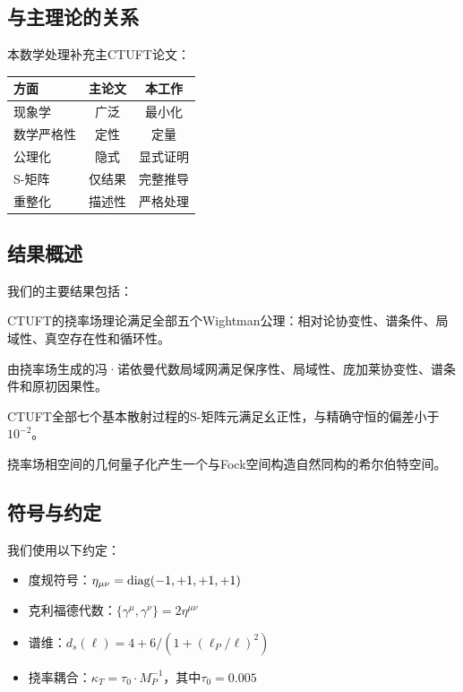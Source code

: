 \subsection{与主理论的关系}

本数学处理补充主CTUFT论文\cite{wang2026ctuft}：

\begin{center}
\begin{tabular}{|l|c|c|}
\hline
\textbf{方面} & \textbf{主论文} & \textbf{本工作} \\
\hline
现象学 & 广泛 & 最小化 \\
数学严格性 & 定性 & 定量 \\
公理化 & 隐式 & 显式证明 \\
S-矩阵 & 仅结果 & 完整推导 \\
重整化 & 描述性 & 严格处理 \\
\hline
\end{tabular}
\end{center}

\subsection{结果概述}

我们的主要结果包括：

\begin{theorem}[Wightman公理]
CTUFT的挠率场理论满足全部五个Wightman公理：相对论协变性、谱条件、局域性、真空存在性和循环性。
\end{theorem}

\begin{theorem}
由挠率场生成的冯·诺依曼代数局域网满足保序性、局域性、庞加莱协变性、谱条件和原初因果性。
\end{theorem}

\begin{theorem}[S-矩阵幺正性]
CTUFT全部七个基本散射过程的S-矩阵元满足幺正性，与精确守恒的偏差小于$10^{-2}$。
\end{theorem}

\begin{theorem}[几何量子化]
挠率场相空间的几何量子化产生一个与Fock空间构造自然同构的希尔伯特空间。
\end{theorem}

\subsection{符号与约定}

我们使用以下约定：
\begin{itemize}
    \item 度规符号：$\eta_{\mu\nu} = \mathrm{diag}(-1, +1, +1, +1)$
    \item 克利福德代数：$\{\gamma^\mu, \gamma^\nu\} = 2\eta^{\mu\nu}$
    \item 谱维：$d_s(\ell) = 4 + 6/(1 + (\ell_P/\ell)^2)$
    \item 挠率耦合：$\kappa_T = \tau_0 \cdot M_P^{-1}$，其中$\tau_0 = 0.005$
\end{itemize}

